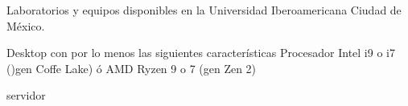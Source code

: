 Laboratorios y equipos disponibles en la Universidad Iberoamericana Ciudad de México.

Desktop con por lo menos las siguientes características
Procesador Intel i9 o i7 ()gen Coffe Lake) ó
AMD Ryzen 9 o 7 (gen Zen 2)

servidor